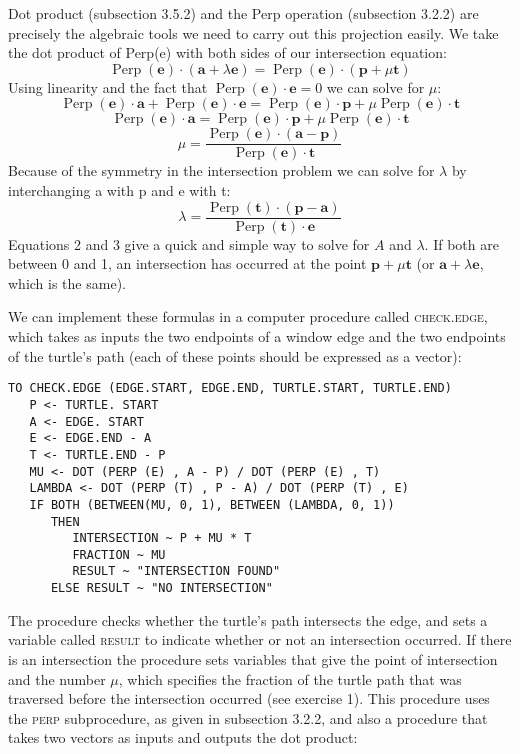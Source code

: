 \documentclass{book}
\begin{document}
Dot product (subsection 3.5.2) and the Perp operation (subsection
3.2.2) are precisely the algebraic tools we need to carry out this projection easily. We take the dot product of Perp(e) with both sides of our
intersection equation:
$$\operatorname{Perp}(\mathbf{e}) \cdot (\mathbf{a} + \lambda \mathbf{e})= \operatorname{Perp}(\mathbf{e}) \cdot (\mathbf{p} + \mu \mathbf{t})$$
Using linearity and the fact that $\operatorname{Perp}(\mathbf{e}) \cdot \mathbf{e} = 0$ we can solve for $\mu$:
$$\operatorname{Perp}(\mathbf{e}) \cdot \mathbf{a} + \operatorname{Perp}(\mathbf{e}) \cdot \mathbf{e} = \operatorname{Perp}(\mathbf{e}) \cdot \mathbf{p} + \mu \operatorname{Perp}(\mathbf{e}) \cdot \mathbf{t}$$
$$\operatorname{Perp}(\mathbf{e}) \cdot \mathbf{a} = \operatorname{Perp}(\mathbf{e}) \cdot \mathbf{p} + \mu \operatorname{Perp}(\mathbf{e}) \cdot \mathbf{t}$$
$$ \mu = \frac{\operatorname{Perp}(\mathbf{e})\cdot(\mathbf{a} - \mathbf{p})}{\operatorname{Perp}(\mathbf{e}) \cdot \mathbf{t}}$$
Because of the symmetry in the intersection problem we can solve for $\lambda$
by interchanging a with p and e with t:
$$ \lambda = \frac{\operatorname{Perp}(\mathbf{t}) \cdot (\mathbf{p} - \mathbf{a})}{\operatorname{Perp}(\mathbf{t}) \cdot \mathbf{e}} $$
Equations 2 and 3 give a quick and simple way to solve for $A$ and $\lambda$.
If both are between 0 and 1, an intersection has occurred at the point
$\mathbf{p} + \mu \mathbf{t}$ (or $\mathbf{a} + \lambda \mathbf{e}$, which is the same).

We can implement these formulas in a computer procedure called
\textsc{check}\textsc{.edge}, which takes as inputs the two endpoints of a window edge
and the two endpoints of the turtle's path (each of these points should
be expressed as a vector):

\begin{verbatim}
TO CHECK.EDGE (EDGE.START, EDGE.END, TURTLE.START, TURTLE.END)
   P <- TURTLE. START
   A <- EDGE. START
   E <- EDGE.END - A
   T <- TURTLE.END - P
   MU <- DOT (PERP (E) , A - P) / DOT (PERP (E) , T)
   LAMBDA <- DOT (PERP (T) , P - A) / DOT (PERP (T) , E)
   IF BOTH (BETWEEN(MU, 0, 1), BETWEEN (LAMBDA, 0, 1))
      THEN
         INTERSECTION ~ P + MU * T
         FRACTION ~ MU
         RESULT ~ "INTERSECTION FOUND"
      ELSE RESULT ~ "NO INTERSECTION"
\end{verbatim}
The procedure checks whether the turtle's path intersects the edge, and
sets a variable called \textsc{result} to indicate whether or not an intersection
occurred. If there is an intersection the procedure sets variables that give
the point of intersection and the number $\mu$, which specifies the fraction
of the turtle path that was traversed before the intersection occurred
(see exercise 1). This procedure uses the \textsc{perp} subprocedure, as given in
subsection 3.2.2, and also a procedure that takes two vectors as inputs
and outputs the dot product:
\end{document}

